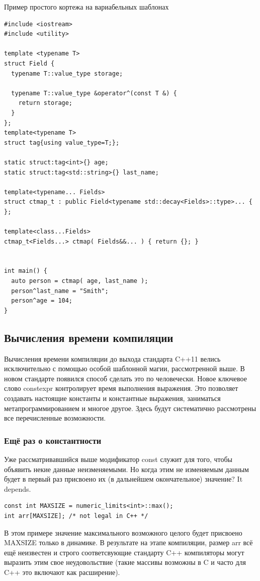 \documentclass[a4paper,12pt,oneside]{article}
\begin{document}
Пример простого кортежа на вариабельных шаблонах

\begin{lstlisting}
#include <iostream>
#include <utility>

template <typename T>
struct Field {
  typename T::value_type storage;

  typename T::value_type &operator^(const T &) {
    return storage;
  }
};
template<typename T>
struct tag{using value_type=T;};

static struct:tag<int>{} age;
static struct:tag<std::string>{} last_name;

template<typename... Fields>
struct ctmap_t : public Field<typename std::decay<Fields>::type>... {
};

template<class...Fields>
ctmap_t<Fields...> ctmap( Fields&&... ) { return {}; }


int main() {
  auto person = ctmap( age, last_name );
  person^last_name = "Smith";
  person^age = 104;
}
\end{lstlisting}


\subsection{Вычисления времени компиляции}

Вычисления времени компиляции до выхода стандарта C++11 велись исключительно с помощью особой шаблонной магии, рассмотренной выше. В новом стандарте появился способ сделать это по человечески. Новое ключевое слово constexpr контролирует время выполнения выражения. Это позволяет создавать настоящие константы и константные выражения, заниматься метапрограммированием и многое другое. Здесь будут систематично рассмотрены все перечисленные возможности.

\subsubsection{Ещё раз о константности}

Уже рассматривавшийся выше модификатор const служит для того, чтобы объявить некие данные неизменяемыми. Но когда этим не изменяемым данным будет в первый раз присвоено их (в дальнейшем окончательное) значение? It depends.

\begin{lstlisting}
const int MAXSIZE = numeric_limits<int>::max();
int arr[MAXSIZE]; /* not legal in C++ */
\end{lstlisting}

В этом примере значение максимального возможного целого будет присвоено MAXSIZE только в динамике. В результате на этапе компиляции, размер arr всё ещё неизвестен и строго соответсвующие стандарту C++ компиляторы могут выразить этим свое неудовольствие (такие массивы возможны в C и часто для C++ это включают как расширение).
\end{document}
